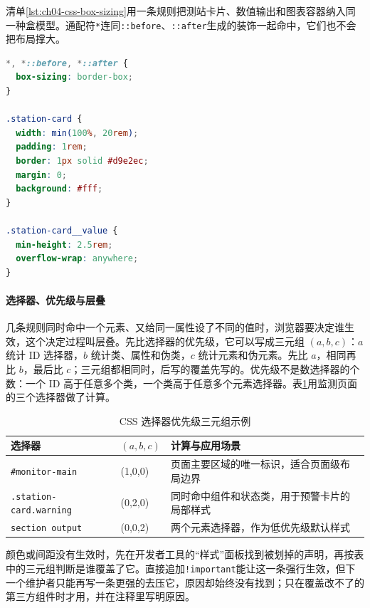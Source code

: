 清单\ref{lst:ch04-css-box-sizing}用一条规则把测站卡片、数值输出和图表容器纳入同一种盒模型。通配符\texttt{*}连同\texttt{::before}、\texttt{::after}生成的装饰一起命中，它们也不会把布局撑大。

\begin{lstlisting}[label={lst:ch04-css-box-sizing},language=CSS,caption={监测卡片的 border-box 盒模型}]
*, *::before, *::after {
  box-sizing: border-box;
}

.station-card {
  width: min(100%, 20rem);
  padding: 1rem;
  border: 1px solid #d9e2ec;
  margin: 0;
  background: #fff;
}

.station-card__value {
  min-height: 2.5rem;
  overflow-wrap: anywhere;
}
\end{lstlisting}

\paragraph{选择器、优先级与层叠}几条规则同时命中一个元素、又给同一属性设了不同的值时，浏览器要决定谁生效，这个决定过程叫层叠。先比选择器的优先级，它可以写成三元组 $(a,b,c)$：$a$ 统计 ID 选择器，$b$ 统计类、属性和伪类，$c$ 统计元素和伪元素。先比 $a$，相同再比 $b$，最后比 $c$；三元组都相同时，后写的覆盖先写的。优先级不是数选择器的个数：一个 ID 高于任意多个类，一个类高于任意多个元素选择器。表\ref{tab:ch04-css-specificity}用监测页面的三个选择器做了计算。

\begin{table}[H]
\centering
\caption{CSS 选择器优先级三元组示例}
\label{tab:ch04-css-specificity}
\begin{tabular}{p{}p{}p{}}
\toprule
选择器 & $(a,b,c)$ & 计算与应用场景 \\
\midrule
\texttt{\#monitor-main} & (1,0,0) & 页面主要区域的唯一标识，适合页面级布局边界 \\
\texttt{.station-card.warning} & (0,2,0) & 同时命中组件和状态类，用于预警卡片的局部样式 \\
\texttt{section output} & (0,0,2) & 两个元素选择器，作为低优先级默认样式 \\
\bottomrule
\end{tabular}
\end{table}

颜色或间距没有生效时，先在开发者工具的“样式”面板找到被划掉的声明，再按表中的三元组判断是谁覆盖了它。直接追加\texttt{!important}能让这一条强行生效，但下一个维护者只能再写一条更强的去压它，原因却始终没有找到；只在覆盖改不了的第三方组件时才用，并在注释里写明原因。

